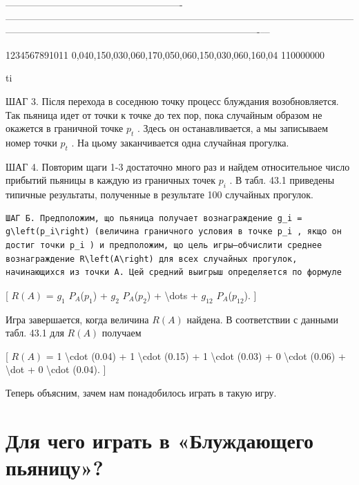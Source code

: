 \documentclass[
]{article}
\begin{document}
{{{\textbar-------------------------------------------------------\textbar---------------------------------------------------------------------------------------------------\textbar----------------------------------------------------------------------------------------\textbar--\textbar--\textbar{}

1234567891011 \textbar{}
0,040,150,030,060,170,050,060,150,030,060,160,04 \textbar{} 110000000
\textbar{} \textbar{} \textbar{}

ti

ШАГ 3. Після перехода в соседнюю точку процесс блуждания возобновляется.
Так пьяница идет от точки к точке до тех пор, пока случайным образом не
окажется в граничной точке \(p_t\) . Здесь он останавливается, а мы
записываем номер точки \(p_t\) . На цьому заканчивается одна случайная
прогулка.

ШАГ 4. Повторим щаги 1-3 достаточно много раз и найдем относительное
число прибытий пьяницы в каждую из граничных точек \(p_i\) . В табл.
43.1 приведены типичные результаты, полученные в результате 100
случайных прогулок.

\begin{verbatim}
ШАГ Б. Предположим, що пьяница получает вознаграждение g_i = g\left(p_i\right) (величина граничного условия в точке p_i , якщо он достиг точки p_i ) и предположим, що цель игры—обчислити среднее вознаграждение R\left(A\right) для всех случайных прогулок, начинающихся из точки A. Цей средний выигрыш определяется по формуле
\end{verbatim}

{[} \(R(A)\) = \(g_1\) \(P_A\)(\(p_1\)) + \(g_2\) \(P_A\)(\(p_2\)) +
\textbackslash dots + \(g_{12}\) \(P_A\)(\(p_{12}\)). {]}

Игра завершается, когда величина \(R\left(A\right)\) найдена. В
соответствии с данными табл. 43.1 для \(R\left(A\right)\) получаем

{[} \(R(A)\) = 1 \textbackslash cdot (0.04) + 1 \textbackslash cdot
(0.15) + 1 \textbackslash cdot (0.03) + 0 \textbackslash cdot (0.06) +
\textbackslash dot + 0 \textbackslash cdot (0.04). {]}

Теперь объясним, зачем нам понадобилось играть в такую игру.

\section{Для чего играть в «Блуждающего
пьяницу»?}\label{ux434ux43bux44f-ux447ux435ux433ux43e-ux438ux433ux440ux430ux442ux44c-ux432-ux431ux43bux443ux436ux434ux430ux44eux449ux435ux433ux43e-ux43fux44cux44fux43dux438ux446ux443}

}}}
\end{document}
